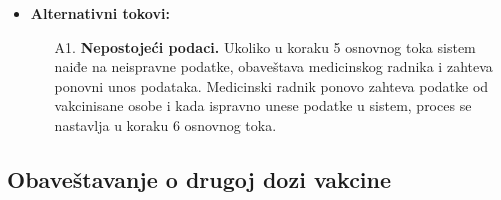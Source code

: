 \documentclass[titlepage]{article}
\begin{document}
\begin{itemize}
    \item \textbf{Alternativni tokovi:}
        \begin{itemize}
            \item[A1.] \textbf{Nepostojeći podaci.} Ukoliko u koraku 5 osnovnog toka sistem naiđe na neispravne podatke, obaveštava medicinskog radnika i zahteva ponovni unos podataka. Medicinski radnik ponovo zahteva podatke od vakcinisane osobe i kada ispravno unese podatke u sistem, proces se nastavlja u koraku 6 osnovnog toka.
        \end{itemize}
    
\end{itemize}


\subsection{Obaveštavanje o drugoj dozi vakcine}
\end{document}
